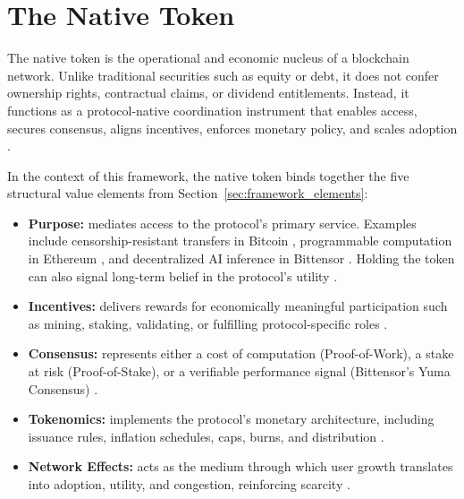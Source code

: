 \documentclass[12pt]{article}
\begin{document}
\section{The Native Token}
\label{sec:native_token}

The native token is the operational and economic nucleus of a blockchain network. Unlike traditional securities such as equity or debt, it does not confer ownership rights, contractual claims, or dividend entitlements. Instead, it functions as a protocol-native coordination instrument that enables access, secures consensus, aligns incentives, enforces monetary policy, and scales adoption \citep{cong2021tokenomics, catalini2020some, gans2019economics}. 

In the context of this framework, the native token binds together the five structural value elements from Section~\ref{sec:framework_elements}:

\begin{itemize}
    \item \textbf{Purpose:} mediates access to the protocol’s primary service. Examples include censorship-resistant transfers in Bitcoin \citep{nakamoto2008bitcoin}, programmable computation in Ethereum \citep{buterin2022proof}, and decentralized AI inference in Bittensor \citep{rao2023bittensor}. Holding the token can also signal long-term belief in the protocol’s utility \citep{huberman2021monetizing, urquhart2022ethereum}.
    
    \item \textbf{Incentives:} delivers rewards for economically meaningful participation such as mining, staking, validating, or fulfilling protocol-specific roles \citep{saleh2021blockchain, biais2020blockchain, catalini2020some}.
    
    \item \textbf{Consensus:} represents either a cost of computation (Proof-of-Work), a stake at risk (Proof-of-Stake), or a verifiable performance signal (Bittensor's Yuma Consensus) \citep{nakamoto2008bitcoin, buterin2022proof, rao2023bittensor}.
    
    \item \textbf{Tokenomics:} implements the protocol’s monetary architecture, including issuance rules, inflation schedules, caps, burns, and distribution \citep{cong2021tokenomics, gans2019economics}.
    
    \item \textbf{Network Effects:} acts as the medium through which user growth translates into adoption, utility, and congestion, reinforcing scarcity \citep{huberman2021monetizing, catalini2020some}.
\end{itemize}
\end{document}
